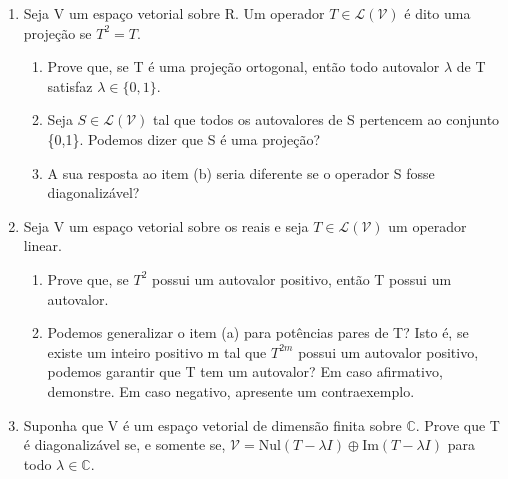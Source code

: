 \documentclass[12pt]{article}
\begin{document}
\begin{enumerate}
    \item Seja V um espaço vetorial sobre R. Um operador $T \in \mathcal{L}(\mathcal{V})$ é dito uma projeção se $T^{2}=T$.
    \begin{enumerate}
        \item Prove que, se T é uma projeção ortogonal, então todo autovalor $\lambda$ de T satisfaz $\lambda \in \{0,1\}$.
        \item Seja $S \in \mathcal{L}(\mathcal{V})$ tal que todos os autovalores de S pertencem ao conjunto \{0,1\}. Podemos dizer que S é uma projeção?
        \item A sua resposta ao item (b) seria diferente se o operador S fosse diagonalizável?
    \end{enumerate}

    \item Seja V um espaço vetorial sobre os reais e seja $T \in \mathcal{L}(\mathcal{V})$ um operador linear.
    \begin{enumerate}
        \item Prove que, se $T^{2}$ possui um autovalor positivo, então T possui um autovalor.
        \item Podemos generalizar o item (a) para potências pares de T? Isto é, se existe um inteiro positivo m tal que $T^{2m}$ possui um autovalor positivo, podemos garantir que T tem um autovalor? Em caso afirmativo, demonstre. Em caso negativo, apresente um contraexemplo.
    \end{enumerate}

    \item Suponha que V é um espaço vetorial de dimensão finita sobre $\mathbb{C}$. Prove que T é diagonalizável se, e somente se, $\mathcal{V} = \text{Nul}(T-\lambda I) \oplus \text{Im}(T-\lambda I)$ para todo $\lambda \in \mathbb{C}$.


\end{enumerate}
\end{document}
